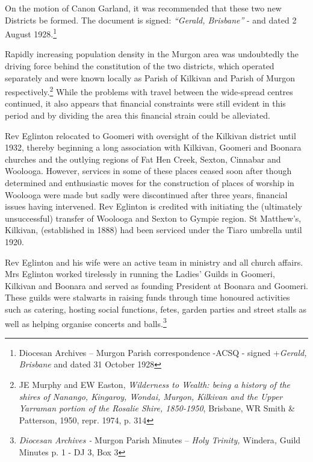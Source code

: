 On the motion of Canon Garland, it was recommended that these two new Districts be formed. The document is signed: \emph{``Gerald, Brisbane''} - and dated 2 August 1928.\footnote{Diocesan Archives -- Murgon Parish correspondence -ACSQ - signed +\emph{Gerald, Brisbane} and dated 31 October 1928}


Rapidly increasing population density in the Murgon area was undoubtedly the driving force behind the constitution of the two districts, which operated separately and were known locally as Parish of Kilkivan and Parish of Murgon respectively.\footnote{JE Murphy and EW Easton, \emph{Wilderness to Wealth: being a history of the shires of Nanango, Kingaroy, Wondai, Murgon, Kilkivan and the Upper Yarraman portion of the Rosalie Shire, 1850-1950}, Brisbane, WR Smith \& Patterson, 1950, repr. 1974, p. 314} While the problems with travel between the wide-spread centres continued, it also appears that financial constraints were still evident in this period and by dividing the area this financial strain could be alleviated.


\balance


Rev Eglinton relocated to Goomeri with oversight of the Kilkivan district until 1932, thereby beginning a long association with Kilkivan, Goomeri and Boonara churches and the outlying regions of Fat Hen Creek, Sexton, Cinnabar and Woolooga. However, services in some of these places ceased soon after though determined and enthusiastic moves for the construction of places of worship in Woolooga were made but sadly were discontinued after three years, financial issues having intervened. Rev Eglinton is credited with initiating the (ultimately unsuccessful) transfer of Woolooga and Sexton to Gympie region. St Matthew's, Kilkivan, (established in 1888) had been serviced under the Tiaro umbrella until 1920.



Rev Eglinton and his wife were an active team in ministry and all church affairs. Mrs Eglinton worked tirelessly in running the Ladies' Guilds in Goomeri, Kilkivan and Boonara and served as founding President at Boonara and Goomeri. These guilds were stalwarts in raising funds through time honoured activities such as catering, hosting social functions, fetes, garden parties and street stalls as well as helping organise concerts and balls.\footnote{\emph{Diocesan Archives -} Murgon Parish Minutes -- \emph{Holy Trinity,} Windera\emph{,} Guild Minutes p. 1 - DJ 3, Box 3}


\printendnotes[custom]
\setcounter{endnote}{0}


